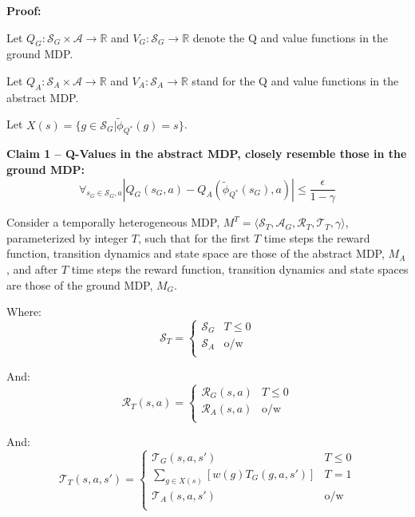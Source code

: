 \documentclass{article}
\newcommand{\ep}{\widetilde \phi}
\newcommand{\epQ}{\ep_{Q^*}}
\begin{document}
\textbf{Proof:}

Let $Q_G : \mathcal{S}_G \times \mathcal{A} \rightarrow \mathbb{R}$ and $V_G : \mathcal{S}_G \rightarrow \mathbb{R}$ denote the Q and value functions in the ground \ac{MDP}.

Let $Q_A  : \mathcal{S}_A \times \mathcal{A} \rightarrow \mathbb{R}$ and $V_A : \mathcal{S}_A \rightarrow \mathbb{R}$  stand for the Q and value functions in the abstract \ac{MDP}.

Let $X(s) = \{g \in \mathcal{S}_G | \epQ(g) = s\}$.

\textbf{Claim 1 -- Q-Values in the abstract MDP, closely resemble those in the ground MDP:}
\begin{equation}
\label{eq:Q*Claim1}
\forall_{s_G \in \mathcal{S}_G, a} |Q_G(s_G, a) - Q_A(\epQ(s_G), a)| \leq \frac{\epsilon}{1-\gamma}
\end{equation}

Consider a temporally heterogeneous \ac{MDP}, $M^T = \langle \mathcal{S}_T, \mathcal{A}_G, \mathcal{R}_T, \mathcal{T}_T, \gamma \rangle$, parameterized by integer $T$, such that for the first $T$ time steps the reward function, transition dynamics and state space are those of the abstract MDP, $M_A$, and after $T$ time steps the reward function, transition dynamics and state spaces are those of the ground MDP, $M_G$. 

Where:
\begin{equation}
\mathcal{S}_T = \begin{cases}
\mathcal{S}_G& T \leq 0 \\
\mathcal{S}_A& \text{o/w} \\
\end{cases}
\end{equation}

And:
\begin{equation}
\mathcal{R}_T(s,a) = \begin{cases}
\mathcal{R}_G(s,a)& T \leq 0 \\
\mathcal{R}_A(s, a)& \text{o/w} \\
\end{cases}
\end{equation}

And:
\begin{equation}
\mathcal{T}_T(s,a,s') = \begin{cases}
\mathcal{T}_G(s,a,s')& T \leq 0 \\
\underset{{g \in X(s)}}{\sum}\left[w(g)T_G(g, a, s')\right]& T = 1 \\
\mathcal{T}_A(s,a,s')& \text{o/w} \\
\end{cases}
\end{equation}
\end{document}
